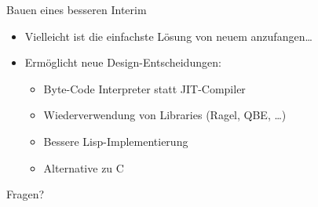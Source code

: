 \documentclass[presentation]{beamer}
\begin{document}
\begin{frame}[label=sec-5-7]{Bauen eines besseren Interim}
\begin{itemize}
\item Vielleicht ist die einfachste Lösung von neuem anzufangen\ldots{}
\item Ermöglicht neue Design-Entscheidungen:
\begin{itemize}
\item Byte-Code Interpreter statt JIT-Compiler
\item Wiederverwendung von Libraries (Ragel, QBE, \ldots{})
\item Bessere Lisp-Implementierung
\item Alternative zu C
\end{itemize}
\end{itemize}
\end{frame}

\begin{frame}[label=sec-5-8]{Fragen?}
\end{frame}
\end{document}
